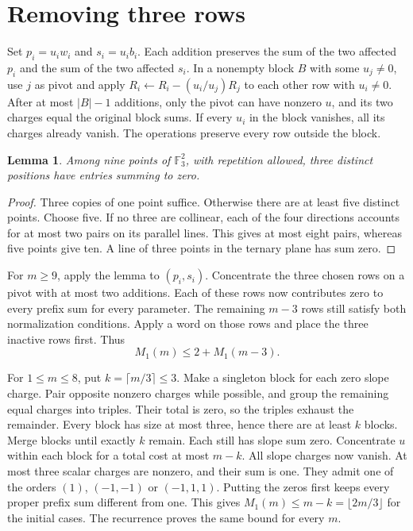 \documentclass[a4paper,11pt]{article}
\newcommand{\F}{\mathbb F_3}
\newcommand{\cost}{\lfloor 2m/3\rfloor}
\newtheorem{lem}[thm]{Lemma}
\begin{document}
\section{Removing three rows}
Set $p_i=u_iw_i$ and $s_i=u_ib_i$. Each addition preserves the sum of the two affected $p_i$ and the sum of the two affected $s_i$. In a nonempty block $B$ with some $u_j\ne0$, use $j$ as pivot and apply $R_i\gets R_i-(u_i/u_j)R_j$ to each other row with $u_i\ne0$. After at most $|B|-1$ additions, only the pivot can have nonzero $u$, and its two charges equal the original block sums. If every $u_i$ in the block vanishes, all its charges already vanish. The operations preserve every row outside the block.
\begin{lem}
Among nine points of $\F^2$, with repetition allowed, three distinct positions have entries summing to zero.
\end{lem}
\begin{proof}
Three copies of one point suffice. Otherwise there are at least five distinct points. Choose five. If no three are collinear, each of the four directions accounts for at most two pairs on its parallel lines. This gives at most eight pairs, whereas five points give ten. A line of three points in the ternary plane has sum zero.
\end{proof}
\newpage
For $m\ge9$, apply the lemma to $(p_i,s_i)$. Concentrate the three chosen rows on a pivot with at most two additions. Each of these rows now contributes zero to every prefix sum for every parameter. The remaining $m-3$ rows still satisfy both normalization conditions. Apply a word on those rows and place the three inactive rows first. Thus
\[
                         M_1(m)\le2+M_1(m-3).
\]

For $1\le m\le8$, put $k=\lceil m/3\rceil\le3$. Make a singleton block for each zero slope charge. Pair opposite nonzero charges while possible, and group the remaining equal charges into triples. Their total is zero, so the triples exhaust the remainder. Every block has size at most three, hence there are at least $k$ blocks. Merge blocks until exactly $k$ remain. Each still has slope sum zero. Concentrate $u$ within each block for a total cost at most $m-k$.
All slope charges now vanish. At most three scalar charges are nonzero, and their sum is one. They admit one of the orders $(1)$, $(-1,-1)$ or $(-1,1,1)$. Putting the zeros first keeps every proper prefix sum different from one. This gives $M_1(m)\le m-k=\cost$ for the initial cases. The recurrence proves the same bound for every $m$.
\end{document}
